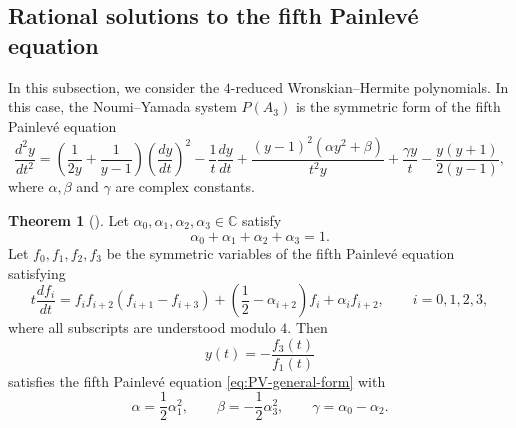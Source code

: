 \documentclass[preprint,3p,10pt]{elsarticle}
\theoremstyle{definition}
\newtheorem{theorem}{Theorem}[section]
\begin{document}
\subsection{Rational solutions to the fifth Painlev\'e equation}
\label{subsec:4-reduced-WH-PV}
 In this subsection, we consider the \(4\)-reduced Wronskian--Hermite polynomials.  In this case, the Noumi--Yamada system \(P(A_3)\) is 
the symmetric form of the fifth Painlev\'e equation 
\begin{equation}
\label{eq:PV-general-form}
\frac{d^2 y}{dt^2}
=
\left(\frac{1}{2y}+\frac{1}{y-1}\right)
\left(\frac{dy}{dt}\right)^2
-\frac{1}{t}\frac{dy}{dt}
+\frac{(y-1)^2(\alpha y^2+\beta)}{t^2y}
+\frac{\gamma y}{t}
-\frac{y(y+1)}{2(y-1)},
\end{equation}
where \(\alpha,\beta\) and \(\gamma\) are complex constants. 

 

\begin{theorem}[{\cite{masuda2002determinant}}]
\label{thm:MOK-PV-symmetric-form}
Let \(\alpha_0,\alpha_1,\alpha_2,\alpha_3\in\mathbb C\) satisfy
\begin{equation}
    \alpha_0+\alpha_1+\alpha_2+\alpha_3=1.
\end{equation}
Let \(f_0,f_1,f_2,f_3\) be the symmetric variables of
the fifth Painlev\'e equation satisfying
\begin{equation}
\label{eq:MOK-PV-symmetric-form}
    t\frac{df_i}{dt}
    =
    f_i f_{i+2}(f_{i+1}-f_{i+3})
    +
    \left(\frac12-\alpha_{i+2}\right)f_i
    +
    \alpha_i f_{i+2},
    \qquad i=0,1,2,3,
\end{equation}
where all subscripts are understood modulo \(4\). Then
\begin{equation}
\label{eq:MOK-PV-y}
    y(t)=-\frac{f_3(t)}{f_1(t)}
\end{equation}
satisfies the fifth Painlev\'e equation \eqref{eq:PV-general-form} with
\begin{equation}
\label{eq:MOK-PV-parameter-relation}
    \alpha=\frac12\alpha_1^2,
    \qquad
    \beta=-\frac12\alpha_3^2,
    \qquad
    \gamma=\alpha_0-\alpha_2.
\end{equation}
\end{theorem}
\end{document}
